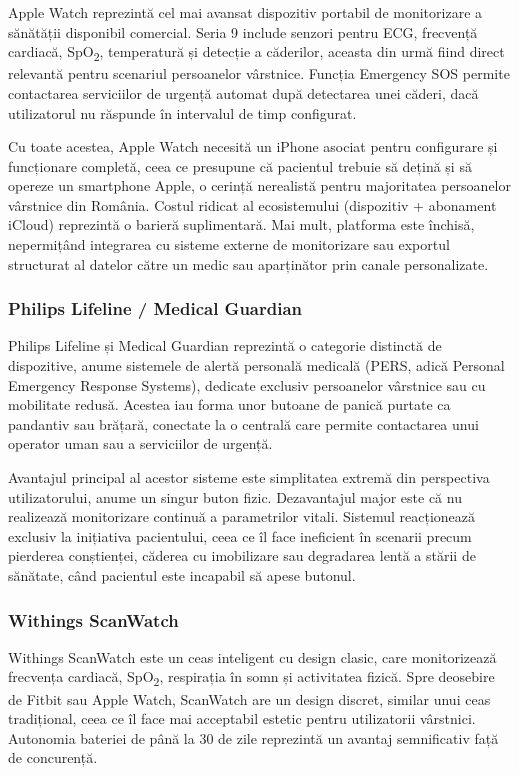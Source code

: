 \documentclass[12pt,a4paper]{article}
\newcommand{\spo}{SpO\textsubscript{2}}
\begin{document}
Apple Watch reprezintă cel mai avansat dispozitiv portabil de monitorizare a sănătății disponibil comercial. Seria 9 include senzori pentru ECG, frecvență cardiacă, \spo, temperatură și detecție a căderilor, aceasta din urmă fiind direct relevantă pentru scenariul persoanelor vârstnice. Funcția Emergency SOS permite contactarea serviciilor de urgență automat după detectarea unei căderi, dacă utilizatorul nu răspunde în intervalul de timp configurat.

Cu toate acestea, Apple Watch necesită un iPhone asociat pentru configurare și funcționare completă, ceea ce presupune că pacientul trebuie să dețină și să opereze un smartphone Apple, o cerință nerealistă pentru majoritatea persoanelor vârstnice din România. Costul ridicat al ecosistemului (dispozitiv + abonament iCloud) reprezintă o barieră suplimentară. Mai mult, platforma este închisă, nepermițând integrarea cu sisteme externe de monitorizare sau exportul structurat al datelor către un medic sau aparținător prin canale personalizate.

\subsubsection{Philips Lifeline / Medical Guardian}

Philips Lifeline și Medical Guardian reprezintă o categorie distinctă de dispozitive, anume sistemele de alertă personală medicală (PERS, adică Personal Emergency Response Systems), dedicate exclusiv persoanelor vârstnice sau cu mobilitate redusă. Acestea iau forma unor butoane de panică purtate ca pandantiv sau brățară, conectate la o centrală care permite contactarea unui operator uman sau a serviciilor de urgență.

Avantajul principal al acestor sisteme este simplitatea extremă din perspectiva utilizatorului, anume un singur buton fizic. Dezavantajul major este că nu realizează monitorizare continuă a parametrilor vitali. Sistemul reacționează exclusiv la inițiativa pacientului, ceea ce îl face ineficient în scenarii precum pierderea conștienței, căderea cu imobilizare sau degradarea lentă a stării de sănătate, când pacientul este incapabil să apese butonul.

\subsubsection{Withings ScanWatch}

Withings ScanWatch este un ceas inteligent cu design clasic, care monitorizează frecvența cardiacă, \spo, respirația în somn și activitatea fizică. Spre deosebire de Fitbit sau Apple Watch, ScanWatch are un design discret, similar unui ceas tradițional, ceea ce îl face mai acceptabil estetic pentru utilizatorii vârstnici. Autonomia bateriei de până la 30 de zile reprezintă un avantaj semnificativ față de concurență.
\end{document}
